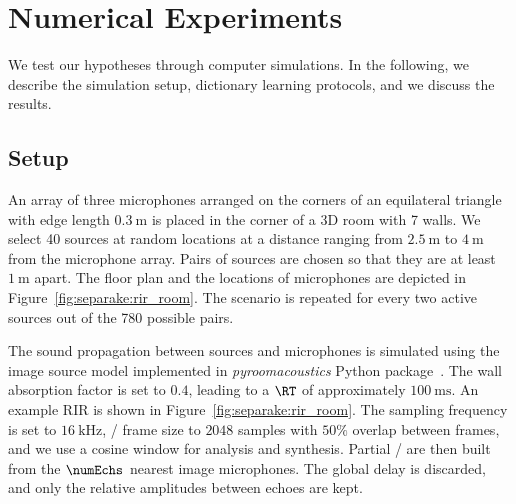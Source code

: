\section{Numerical Experiments}

We test our hypotheses through computer simulations.
In the following, we describe the simulation setup, dictionary learning protocols, and we discuss the results.

\subsection{Setup}
An array of three microphones arranged on the corners of an equilateral triangle with edge length $\SI{0.3}{\m}$ is placed in the corner of a 3D room with 7 walls.
We select 40 sources at random locations at a distance ranging from $\SI{2.5}{\m}$ to $\SI{4}{\m}$ from the microphone array.
Pairs of sources are chosen so that they are at least $\SI{1}{\m}$ apart.
The floor plan and the locations of microphones are depicted in Figure~\ref{fig:separake:rir_room}.
The scenario is repeated for every two active sources out of the 780 possible pairs.

\mynewline
The sound propagation between sources and microphones is simulated using the
image source model implemented in \textit{pyroomacoustics} Python package~.
The wall absorption factor is set to $0.4$, leading to a $\RT$ of approximately $\SI{100}{\ms}$.
An example RIR is shown in Figure~\ref{fig:separake:rir_room}.
The sampling frequency is set to $\SI{16}{\kHz}$, \STFT/ frame size to $2048$ samples with $50\%$ overlap between frames, and we use a cosine window for analysis and synthesis.
Partial \RTFs/ are then built from the $\numEchs$ nearest image microphones.
The global delay is discarded, and only the relative amplitudes between echoes are kept.

